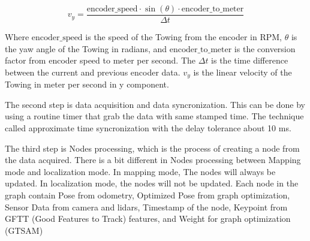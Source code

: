 \documentclass[conference]{IEEEtran}
\begin{document}
\begin{equation}
	v_y = \frac{\text{encoder\_speed} \cdot \sin(\theta) \cdot \text{encoder\_to\_meter}}{\Delta t}
	\label{eq:vy}
\end{equation}

Where \(\text{encoder\_speed}\) is the speed of the Towing from the encoder in RPM, \(\theta\) is the yaw angle of the Towing in radians, and \(\text{encoder\_to\_meter}\) is the conversion factor from encoder speed to meter per second. The \(\Delta t\) is the time difference between the current and previous encoder data. \(v_y\) is the linear velocity of the Towing in meter per second in y component.

\par    
The second step is data acquisition and data syncronization. This can be done by using a routine timer that grab the data with same stamped time. The technique called approximate time syncronization with the delay tolerance about 10 ms. 

\par    
The third step is Nodes processing, which is the process of creating a node from the data acquired. There is a bit different in Nodes processing between Mapping mode and localization mode. In mapping mode, The nodes will always be updated. In localization mode, the nodes will not be updated. Each node in the graph contain Pose from odometry, Optimized Pose from graph optimization, Sensor Data from camera and lidars, Timestamp of the node, Keypoint from GFTT (Good Features to Track) features, and Weight for graph optimization (GTSAM)
\end{document}
